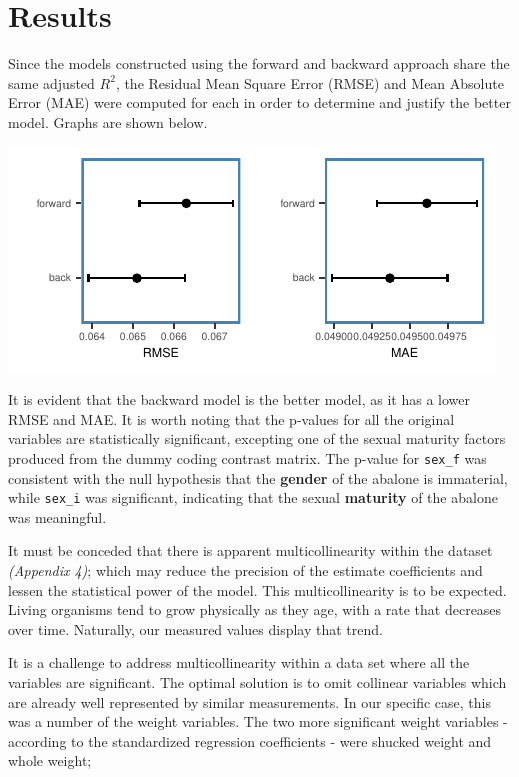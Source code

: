\documentclass[letterpaper,9pt,twocolumn,twoside,]{pinp}
\begin{document}
\hypertarget{results}{%
\section{Results}\label{results}}

Since the models constructed using the forward and backward approach
share the same adjusted \(R^2\), the Residual Mean Square Error (RMSE)
and Mean Absolute Error (MAE) were computed for each in order to
determine and justify the better model. Graphs are shown below.

\begin{center}\includegraphics{ExecSum_files/figure-latex/unnamed-chunk-8-1} \end{center}

It is evident that the backward model is the better model, as it has a
lower RMSE and MAE. It is worth noting that the p-values for all the
original variables are statistically significant, excepting one of the
sexual maturity factors produced from the dummy coding contrast matrix.
The p-value for \texttt{sex\_f} was consistent with the null hypothesis
that the \textbf{gender} of the abalone is immaterial, while
\texttt{sex\_i} was significant, indicating that the sexual
\textbf{maturity} of the abalone was meaningful.

\par

It must be conceded that there is apparent multicollinearity within the
dataset \emph{(Appendix 4)}; which may reduce the precision of the
estimate coefficients and lessen the statistical power of the model.
This multicollinearity is to be expected. Living organisms tend to grow
physically as they age, with a rate that decreases over time. Naturally,
our measured values display that trend.

\par

It is a challenge to address multicollinearity within a data set where
all the variables are significant. The optimal solution is to omit
collinear variables which are already well represented by similar
measurements. In our specific case, this was a number of the weight
variables. The two more significant weight variables - according to the
standardized regression coefficients - were shucked weight and whole
weight;
\end{document}
